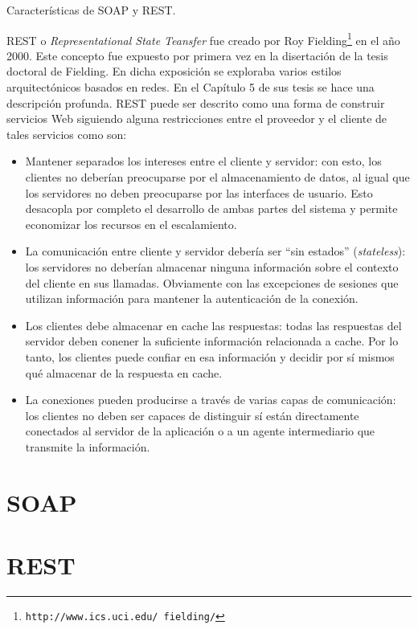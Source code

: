 \documentclass[conference]{IEEEtran}
\begin{document}
Características de SOAP y REST.

REST o \textsl{Representational State Teansfer} fue creado por Roy
Fielding\footnote{\texttt{http://www.ics.uci.edu/~fielding/}} en el
año 2000. Este concepto fue expuesto por primera vez en la disertación
de la tesis doctoral de Fielding. En dicha exposición se exploraba
varios estilos arquitectónicos basados en redes. En el Capítulo 5
\cite{FieldingPhD} de sus tesis se hace una descripción profunda. REST
puede ser descrito como una forma de construir servicios Web siguiendo
alguna restricciones entre el proveedor y el cliente de tales
servicios como son:

\begin{itemize}
\item Mantener separados los intereses entre el cliente y servidor:
  con esto, los clientes no deberían preocuparse por el almacenamiento
  de datos, al igual que los servidores no deben preocuparse por las
  interfaces de usuario. Esto desacopla por completo el desarrollo de
  ambas partes del sistema y permite economizar los recursos en el
  escalamiento. 
\item La comunicación entre cliente y servidor debería ser ``sin
  estados'' (\emph{stateless}):  los servidores no deberían almacenar
  ninguna información sobre el contexto del cliente en sus
  llamadas. Obviamente con las excepciones de sesiones que utilizan
  información para mantener la autenticación de la conexión.
\item Los clientes debe almacenar en cache  las respuestas: todas las
  respuestas del servidor deben conener la suficiente información
  relacionada a cache. Por lo tanto, los clientes puede confiar en esa
  información y decidir por sí mismos qué almacenar de la respuesta en
  cache. 
\item La conexiones pueden producirse  a través de varias capas de
  comunicación: los clientes no deben ser capaces de distinguir sí
  están directamente conectados al servidor de la aplicación o a un
  agente intermediario que transmite la información. 
\end{itemize}

\section{SOAP}
\label{sec:soap}



\lipsum[1]

\section{REST}
\label{sec:soap}
\end{document}
